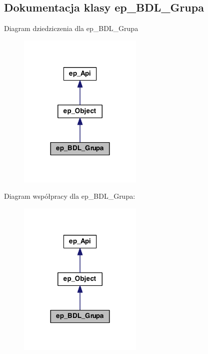\hypertarget{classep___b_d_l___grupa}{\subsection{Dokumentacja klasy ep\-\_\-\-B\-D\-L\-\_\-\-Grupa}
\label{classep___b_d_l___grupa}
}


Diagram dziedziczenia dla ep\-\_\-\-B\-D\-L\-\_\-\-Grupa\nopagebreak
\begin{figure}[H]
\begin{center}
\leavevmode
\includegraphics[width=168pt]{classep___b_d_l___grupa__inherit__graph}
\end{center}
\end{figure}


Diagram współpracy dla ep\-\_\-\-B\-D\-L\-\_\-\-Grupa\-:\nopagebreak
\begin{figure}[H]
\begin{center}
\leavevmode
\includegraphics[width=168pt]{classep___b_d_l___grupa__coll__graph}
\end{center}
\end{figure}
